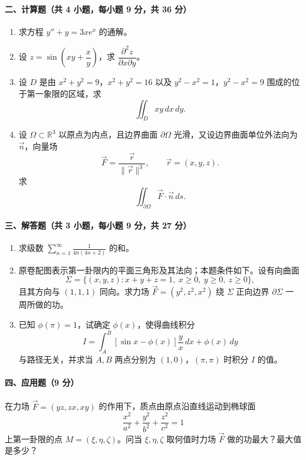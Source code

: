 \paragraph*{二、计算题（共 4 小题，每小题 9 分，共 36 分）}
\begin{enumerate}
  \item 求方程 $y''+y=3xe^x$ 的通解。
  \item 设 $z=\sin\left(xy+\dfrac{x}{y}\right)$，求 $\dfrac{\partial^2z}{\partial x\partial y}$。
  \item 设 $D$ 是由 $x^2+y^2=9$，$x^2+y^2=16$ 以及 $y^2-x^2=1$，$y^2-x^2=9$ 围成的位于第一象限的区域，求
  \[
    \iint_D xy\,dx\,dy.
  \]
  \item 设 $\Omega\subset\mathbb R^3$ 以原点为内点，且边界曲面 $\partial\Omega$ 光滑，又设边界曲面单位外法向为 $\vec n$，向量场
  \[
    \vec F=\frac{\vec r}{\|\vec r\|^3},\qquad \vec r=(x,y,z).
  \]
  求
  \[
    \iint_{\partial\Omega}\vec F\cdot\vec n\,ds.
  \]
\end{enumerate}

\paragraph*{三、解答题（共 3 小题，每小题 9 分，共 27 分）}
\begin{enumerate}
  \item 求级数 $\displaystyle \sum_{n=1}^\infty \frac1{4n(4n+2)}$ 的和。
  \item 原卷配图表示第一卦限内的平面三角形及其法向；本题条件如下。设有向曲面
  \[
    \Sigma=\{(x,y,z):x+y+z=1,\ x\ge 0,\ y\ge 0,\ z\ge 0\},
  \]
  且其方向与 $(1,1,1)$ 同向。求力场 $\vec F=(y^2,z^2,x^2)$ 绕 $\Sigma$ 正向边界 $\partial\Sigma$ 一周所做的功。
  \item 已知 $\phi(\pi)=1$，试确定 $\phi(x)$，使得曲线积分
  \[
    I=\int_A^B \left[\sin x-\phi(x)\right]\frac{y}{x}\,dx+\phi(x)\,dy
  \]
  与路径无关，并求当 $A,B$ 两点分别为 $(1,0)$，$(\pi,\pi)$ 时积分 $I$ 的值。
\end{enumerate}

\paragraph*{四、应用题（9 分）}
在力场 $\vec F=(yz,zx,xy)$ 的作用下，质点由原点沿直线运动到椭球面
\[
  \frac{x^2}{a^2}+\frac{y^2}{b^2}+\frac{z^2}{c^2}=1
\]
上第一卦限的点 $M=(\xi,\eta,\zeta)$。问当 $\xi,\eta,\zeta$ 取何值时力场 $\vec F$ 做的功最大？最大值是多少？

